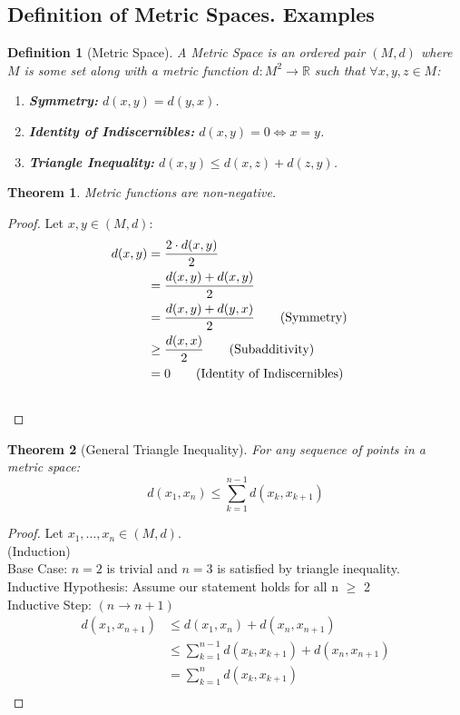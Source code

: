 \documentclass{article}
\newtheorem{definition}{Definition}[section]
\newtheorem{theorem}{Theorem}[section]
\begin{document}
		\subsection{Definition of Metric Spaces. Examples}
			
			\begin{definition}[Metric Space]
				A Metric Space is an ordered pair $(M, d)$ where $M$ is some set along with a metric function $d \colon M^2 \to \mathbb{R}$ such that $\forall x, y, z \in M$:
				\begin{enumerate}
					\item \textbf{Symmetry:} $d(x, y) = d(y, x)$.
					\item \textbf{Identity of Indiscernibles:} $d(x, y) = 0 \Leftrightarrow x=y$.
					\item \textbf{Triangle Inequality:} $d(x, y) \leq d(x, z) + d(z, y)$.
				\end{enumerate}
			\end{definition}
		
			\begin{theorem}
				Metric functions are non-negative.
			\end{theorem}
			\begin{proof}
				Let $x, y \in (M, d)$:
				\begin{align*}
					d(x, y) &= \dfrac{2 \cdot d(x, y)}{2}\\
					&= \dfrac{d(x, y) + d(x, y)}{2}\\
					&= \dfrac{d(x, y) + d(y, x)}{2} \tag{Symmetry}\\
					&\geq \dfrac{d(x, x)}{2} \tag{Subadditivity}\\
					&= 0 \tag{Identity of Indiscernibles} \\ &&\qedhere
				\end{align*}
			\end{proof}

			\begin{theorem}[General Triangle Inequality]
			\label{general triangle inequality}
				For any sequence of points in a metric space:
				$$d(x_1,x_n) \leq \sum\limits_{k=1}^{n-1} d(x_k,x_{k+1})$$
			\end{theorem}
			\begin{proof}
				Let $x_1,\ldots,x_n \in (M, d)$. \\
				(Induction)\\
				Base Case: $n=2$ is trivial and $n=3$ is satisfied by triangle inequality.\\
				Inductive Hypothesis: Assume our statement holds for all n $\geq$ 2\\
				Inductive Step: $\left(n \longrightarrow n+1\right)$
				\begin{align*}
					d(x_1,x_{n+1}) &\leq d(x_1,x_n) + d(x_n,x_{n+1})\\
					&\leq \sum\limits_{k=1}^{n-1} d(x_k,x_{k+1}) + d(x_n,x_{n+1})\\
					&= \sum\limits_{k=1}^{n} d(x_k,x_{k+1})\\
				\end{align*}
			\end{proof}
\end{document}
